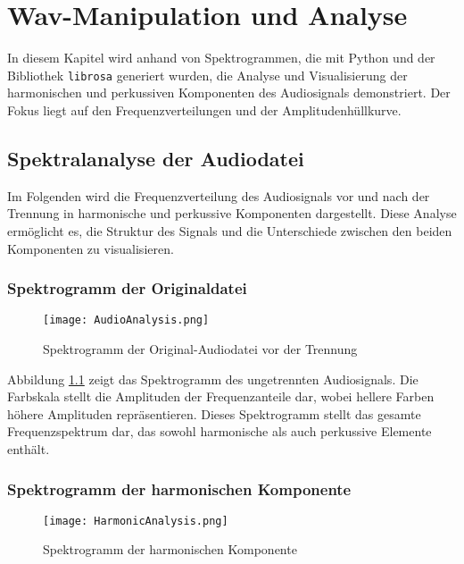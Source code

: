 \chapter{Wav-Manipulation und Analyse}

In diesem Kapitel wird anhand von Spektrogrammen, die mit Python und der Bibliothek \texttt{librosa} generiert wurden, die Analyse und Visualisierung der harmonischen und perkussiven Komponenten des Audiosignals demonstriert. Der Fokus liegt auf den Frequenzverteilungen und der Amplitudenhüllkurve.

\section{Spektralanalyse der Audiodatei}

Im Folgenden wird die Frequenzverteilung des Audiosignals vor und nach der Trennung in harmonische und perkussive Komponenten dargestellt. Diese Analyse ermöglicht es, die Struktur des Signals und die Unterschiede zwischen den beiden Komponenten zu visualisieren.	

\subsection{Spektrogramm der Originaldatei}

\begin{figure}
    \centering
    \texttt{[image: AudioAnalysis.png]}
    \caption{Spektrogramm der Original-Audiodatei vor der Trennung}
    \label{fig:audio_analysis}
\end{figure}

Abbildung \ref{fig:audio_analysis} zeigt das Spektrogramm des ungetrennten Audiosignals. Die Farbskala stellt die Amplituden der Frequenzanteile dar, wobei hellere Farben höhere Amplituden repräsentieren. Dieses Spektrogramm stellt das gesamte Frequenzspektrum dar, das sowohl harmonische als auch perkussive Elemente enthält.

\subsection{Spektrogramm der harmonischen Komponente}

\begin{figure}
    \centering
    \texttt{[image: HarmonicAnalysis.png]}
    \caption{Spektrogramm der harmonischen Komponente}
    \label{fig:harmonic_analysis}
\end{figure}

